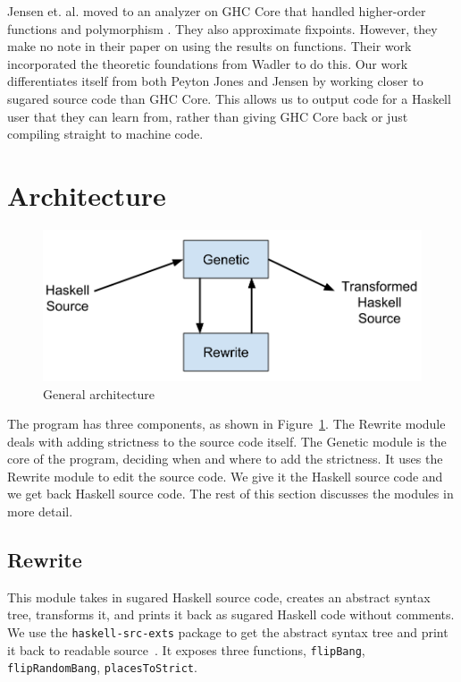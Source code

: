 \documentclass[preprint,nocopyrightspace]{sigplanconf}
\begin{document}
Jensen et. al. moved to an analyzer on GHC Core that handled higher-order functions and polymorphism \cite{jensen}. They also approximate fixpoints. However, they make no note in their paper on using the results on functions. Their work incorporated the theoretic foundations from Wadler\cite{wadler} to do this. Our work differentiates itself from both Peyton Jones and Jensen by working closer to sugared source code than GHC Core. This allows us to output code for a Haskell user that they can learn from, rather than giving GHC Core back or just compiling straight to machine code.

\section{Architecture}\label{sec:arch}
\begin{figure}[t]
\includegraphics[width=\columnwidth]{modules.png}
\caption{General architecture}
\label{fig:arch}
\end{figure}
The program has three components, as shown in Figure~\ref{fig:arch}. The Rewrite module deals with adding strictness to the source code itself. The Genetic module is the core of the program, deciding when and where to add the strictness. It uses the Rewrite module to edit the source code. We give it the Haskell source code and we get back Haskell source code. The rest of this section discusses the modules in more detail.
\subsection{Rewrite}
This module takes in sugared Haskell source code, creates an abstract syntax tree, transforms it, and prints it back as sugared Haskell code without comments. We use the \lstinline!haskell-src-exts! package to get the abstract syntax tree and print it back to readable source~\cite{hsrcext}. It exposes three functions, \lstinline!flipBang!, \lstinline!flipRandomBang!, \lstinline!placesToStrict!.
\end{document}
